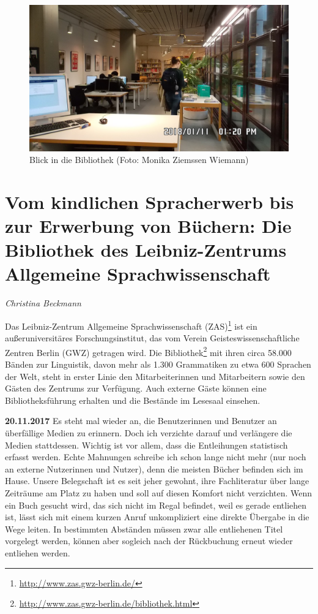\documentclass[a4paper,
fontsize=11pt,
oneside,
numbers=noperiodatend,
parskip=half-,
bibliography=totoc,
final
]{scrartcl}
\begin{document}
\begin{figure}
\centering
\includegraphics{img/SAM_1436.jpg}
\caption{Blick in die Bibliothek (Foto: Monika Ziemssen Wiemann)}
\end{figure}

\newpage

\hypertarget{vom-kindlichen-spracherwerb-bis-zur-erwerbung-von-buxfcchern-die-bibliothek-des-leibniz-zentrums-allgemeine-sprachwissenschaft}{%
\section{Vom kindlichen Spracherwerb bis zur Erwerbung von
Büchern: Die Bibliothek des Leibniz-Zentrums Allgemeine
Sprachwissenschaft}\label{vom-kindlichen-spracherwerb-bis-zur-erwerbung-von-buxfcchern-die-bibliothek-des-leibniz-zentrums-allgemeine-sprachwissenschaft}}

\emph{Christina Beckmann}

Das Leibniz-Zentrum Allgemeine Sprachwissenschaft (ZAS)\footnote{\url{http://www.zas.gwz-berlin.de/}}
ist ein außeruniversitäres Forschungsinstitut, das vom Verein
Geisteswissenschaftliche Zentren Berlin (GWZ) getragen wird. Die
Bibliothek\footnote{\url{http://www.zas.gwz-berlin.de/bibliothek.html}}
mit ihren circa 58.000 Bänden zur Linguistik, davon mehr als 1.300
Grammatiken zu etwa 600 Sprachen der Welt, steht in erster Linie den
Mitarbeiterinnen und Mitarbeitern sowie den Gästen des Zentrums zur
Verfügung. Auch externe Gäste können eine Bibliotheksführung erhalten
und die Bestände im Lesesaal einsehen.

\textbf{20.11.2017} Es steht mal wieder an, die Benutzerinnen und
Benutzer an überfällige Medien zu erinnern. Doch ich verzichte darauf
und verlängere die Medien stattdessen. Wichtig ist vor allem, dass die
Entleihungen statistisch erfasst werden. Echte Mahnungen schreibe ich
schon lange nicht mehr (nur noch an externe Nutzerinnen und Nutzer),
denn die meisten Bücher befinden sich im Hause. Unsere Belegschaft ist
es seit jeher gewohnt, ihre Fachliteratur über lange Zeiträume am Platz
zu haben und soll auf diesen Komfort nicht verzichten. Wenn ein Buch
gesucht wird, das sich nicht im Regal befindet, weil es gerade entliehen
ist, lässt sich mit einem kurzen Anruf unkompliziert eine direkte
Übergabe in die Wege leiten. In bestimmten Abständen müssen zwar alle
entliehenen Titel vorgelegt werden, können aber sogleich nach der
Rückbuchung erneut wieder entliehen werden.
\end{document}

